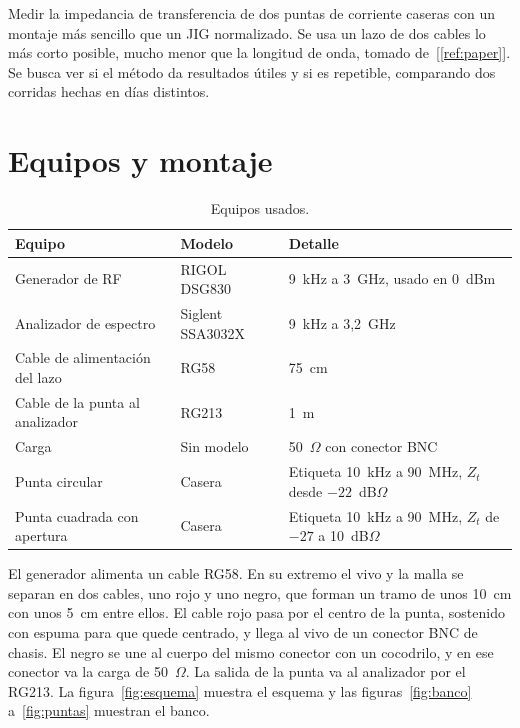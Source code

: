 \documentclass[11pt,a4paper]{article}
\begin{document}
Medir la impedancia de transferencia de dos puntas de corriente caseras con un montaje más sencillo que un JIG normalizado. Se usa un lazo de dos cables lo más corto posible, mucho menor que la longitud de onda, tomado de~[\ref{ref:paper}]. Se busca ver si el método da resultados útiles y si es repetible, comparando dos corridas hechas en días distintos.

\section{Equipos y montaje}

\begin{table}[H]
  \centering
  \begin{tabular}{@{}llp{6.2cm}@{}}
    \toprule
    Equipo & Modelo & Detalle \\
    \midrule
    Generador de RF & RIGOL DSG830 & 9~kHz a 3~GHz, usado en 0~dBm \\
    Analizador de espectro & Siglent SSA3032X & 9~kHz a 3,2~GHz \\
    Cable de alimentación del lazo & RG58 & 75~cm \\
    Cable de la punta al analizador & RG213 & 1~m \\
    Carga & Sin modelo & 50~$\Omega$ con conector BNC \\
    Punta circular & Casera & Etiqueta 10~kHz a 90~MHz, $Z_t$ desde $-22$~dB$\Omega$ \\
    Punta cuadrada con apertura & Casera & Etiqueta 10~kHz a 90~MHz, $Z_t$ de $-27$ a 10~dB$\Omega$ \\
    \bottomrule
  \end{tabular}
  \caption{Equipos usados.}
  \label{tab:equipos}
\end{table}

El generador alimenta un cable RG58. En su extremo el vivo y la malla se separan en dos cables, uno rojo y uno negro, que forman un tramo de unos 10~cm con unos 5~cm entre ellos. El cable rojo pasa por el centro de la punta, sostenido con espuma para que quede centrado, y llega al vivo de un conector BNC de chasis. El negro se une al cuerpo del mismo conector con un cocodrilo, y en ese conector va la carga de 50~$\Omega$. La salida de la punta va al analizador por el RG213. La figura~\ref{fig:esquema} muestra el esquema y las figuras~\ref{fig:banco} a~\ref{fig:puntas} muestran el banco.
\end{document}
